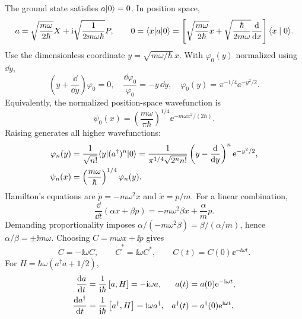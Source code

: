 The ground state satisfies $a\lvert 0\rangle=0$. In position space,
\[
 a=\sqrt{\frac{m\omega}{2\hbar}}X
      +\mathrm{i}\sqrt{\frac1{2m\omega\hbar}}P,
 \qquad
 0=\langle x\rvert a\lvert 0\rangle
 =\left[\sqrt{\frac{m\omega}{2\hbar}}x
       +\sqrt{\frac{\hbar}{2m\omega}}\frac{\mathop{}\!\mathrm{d}}{\mathop{}\!\mathrm{d} x}\right]\langle x\mid 0\rangle.
\]
Use the dimensionless coordinate $y=\sqrt{m\omega/\hbar}\,x$.
With $\varphi_0(y)$ normalized using $\dd y$,
\[
 \left(y+\frac{\dd}{\dd y}\right)\varphi_0=0,
 \quad\frac{\dd\varphi_0}{\varphi_0}=-y\,\dd y,
 \quad\varphi_0(y)=\pi^{-1/4}\ee^{-y^2/2}.
\]
Equivalently, the normalized position-space wavefunction is
\[
 \psi_0(x)=\left(\frac{m\omega}{\pi\hbar}\right)^{1/4}
          \ee^{-m\omega x^2/(2\hbar)}.
\]
Raising generates all higher wavefunctions:
\begin{align*}
 \varphi_n(y)
 &=\frac1{\sqrt{n!}}\langle y\rvert (a^\dagger)^n\lvert 0\rangle
 =\frac1{\pi^{1/4}\sqrt{2^n n!}}
       \left(y-\frac{\mathop{}\!\mathrm{d}}{\mathop{}\!\mathrm{d} y}\right)^n\mathrm{e}^{-y^2/2},\\
 \psi_n(x)&=\left(\frac{m\omega}{\hbar}\right)^{1/4}\varphi_n(y).
\end{align*}
Hamilton's equations are $\dot p=-m\omega^2x$ and $\dot x=p/m$.
For a linear combination,
\[
 \frac{\dd}{\dd t}(\alpha x+\beta p)
 =-m\omega^2\beta x+\frac\alpha m p.
\]
Demanding proportionality imposes
$\alpha/(-m\omega^2\beta)=\beta/(\alpha/m)$, hence
$\alpha/\beta=\pm\ii m\omega$.
Choosing $C=m\omega x+\ii p$ gives
\[
 \dot C=-\ii\omega C,\qquad\dot C^*=\ii\omega C^*,\qquad
 C(t)=C(0)\ee^{-\ii\omega t}.
\]
For $H=\hbar\omega(a^\dagger a+1/2)$,
\begin{align*}
 \frac{\mathop{}\!\mathrm{d} a}{\mathop{}\!\mathrm{d} t}&=\frac1{\mathrm{i}\hbar}\left[a,H\right]=-\mathrm{i}\omega a,
 &a(t)&=a(0)\mathrm{e}^{-\mathrm{i}\omega t},\\
 \frac{\mathop{}\!\mathrm{d} a^\dagger}{\mathop{}\!\mathrm{d} t}&=\frac1{\mathrm{i}\hbar}\left[a^\dagger,H\right]
 =\mathrm{i}\omega a^\dagger,
 &a^\dagger(t)&=a^\dagger(0)\mathrm{e}^{\mathrm{i}\omega t}.
\end{align*}
